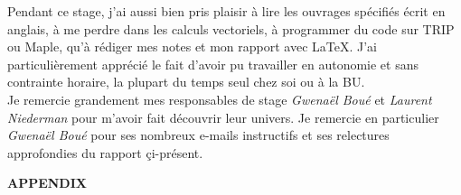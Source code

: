 \documentclass[a4paper]{article}
\begin{document}
{Pendant ce stage, j'ai aussi bien pris plaisir \`a lire les ouvrages sp\'ecifi\'es \'ecrit en anglais, \`a me perdre dans les calculs vectoriels, \`a programmer du code sur TRIP ou Maple, qu'\`a r\'ediger mes notes et mon rapport avec \LaTeX. J'ai particuli\`erement appr\'eci\'e le fait d'avoir pu travailler en autonomie et sans contrainte horaire, la plupart du temps seul chez soi ou \`a la BU. \\
Je remercie grandement mes responsables de stage \textit{Gwena\"el Bou\'e} et \textit{Laurent Niederman} pour m'avoir fait d\'ecouvrir leur univers. Je remercie en particulier \textit{Gwena\"el Bou\'e} pour ses nombreux e-mails instructifs et ses relectures approfondies du rapport \c{c}i-pr\'esent.
}

















\newpage
\appendix

 \begin{center}
 {\LARGE \textbf{APPENDIX}}
 \end{center}
 \vspace{3 cm}
\end{document}
